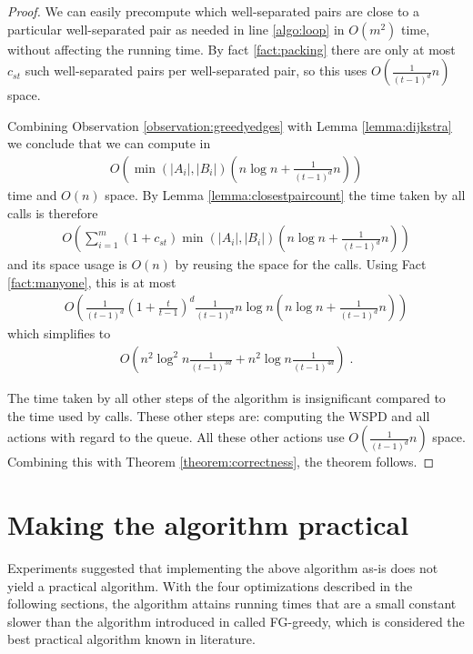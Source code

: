 \documentclass[runningheads,envcountsame,oribibl,orivec]{llncs}
\begin{document}
\begin{proof}
We can easily precompute which well-separated pairs are close to a particular well-separated pair as needed in line \ref{algo:loop} in $O(m^2)$ time, without affecting the running time. By fact \ref{fact:packing} there are only at most $c_{s t}$ such well-separated pairs per well-separated pair, so this uses $O\left(\frac{1}{(t-1)^d} n\right)$ space.

Combining Observation \ref{observation:greedyedges} with Lemma \ref{lemma:dijkstra} we conclude that we can compute  in
\begin{align*}
O\left(\min(|A_i|, |B_i|)\left(n \log n + \frac{1}{(t-1)^d} n\right)\right)
\end{align*}
time and $O(n)$ space. By Lemma \ref{lemma:closestpaircount} the time taken by all  calls is therefore
\begin{align*}
O\left(\sum_{i=1}^m (1 + c_{s t}) \min(|A_i|, |B_i|)\left(n \log n + \frac{1}{(t-1)^d} n\right)\right)
\end{align*}
and its space usage is $O(n)$ by reusing the space for the calls. Using Fact \ref{fact:manyone}, this is at most
\begin{align*}
O\left(\frac{1}{(t-1)^d}\left(1+\frac{t}{t-1}\right)^d\frac{1}{(t-1)^d} n \log n \left(n \log n + \frac{1}{(t-1)^d} n\right) \right)
\end{align*}
which simplifies to
\begin{align*}
O\left(n^2 \log^2 n \frac{1}{(t-1)^{3d}} + n^2 \log n \frac{1}{(t-1)^{4d}}\right)\;.
\end{align*}

The time taken by all other steps of the algorithm is insignificant compared to the time used by  calls. These other steps are: computing the WSPD and all actions with regard to the queue. All these other actions use $O\left(\frac{1}{(t-1)^d} n\right)$ space. Combining this with Theorem \ref{theorem:correctness}, the theorem follows.
\end{proof}

\section{Making the algorithm practical} \label{section:practical}

Experiments suggested that implementing the above algorithm as-is does not yield a practical algorithm. With the four optimizations described in the following sections, the algorithm attains running times that are a small constant slower than the algorithm introduced in \cite{FarshiG09} called FG-greedy, which is considered the best practical algorithm known in literature.
\end{document}
